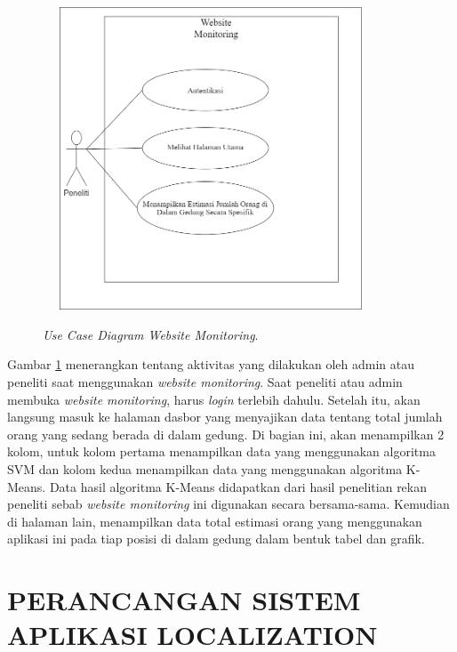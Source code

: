 \begin{figure}[H]
	\center
	\shadowbox
	{\includegraphics [width=10cm, height=9cm]{gambar/model/usecaseWebMonitoring}}
	\caption{\textit{Use Case Diagram Website Monitoring}.}
	\label{usecasewebmonitoring}
\end{figure}

Gambar \ref{usecasewebmonitoring} menerangkan tentang aktivitas yang dilakukan oleh admin atau peneliti saat  menggunakan \textit{website monitoring}. Saat peneliti atau admin membuka \textit{website monitoring}, harus \textit{login} terlebih dahulu. Setelah itu, akan langsung masuk ke halaman dasbor yang menyajikan data tentang total jumlah orang yang sedang berada di dalam gedung. Di bagian ini, akan menampilkan 2 kolom, untuk kolom pertama menampilkan data yang menggunakan algoritma SVM dan kolom kedua menampilkan data yang menggunakan algoritma K-Means. Data hasil algoritma K-Means didapatkan dari hasil penelitian rekan peneliti sebab \textit{website monitoring} ini digunakan secara bersama-sama. Kemudian di halaman lain, menampilkan data total estimasi orang yang menggunakan aplikasi ini pada tiap posisi di dalam gedung dalam bentuk tabel dan grafik.


\section{PERANCANGAN SISTEM APLIKASI LOCALIZATION}


